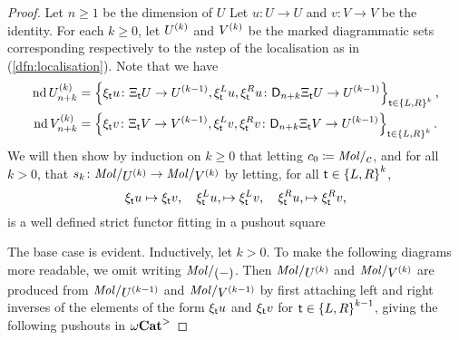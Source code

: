 \begin{proof}
    Let \( n \geq 1 \) be the dimension of \( U \)
    Let \( u \colon U \to U \) and \( v \colon V \to V \) be the identity.
    For each \( k \geq 0 \), let \( \order{k}{U} \) and \( \order{k}{V} \) be the marked diagrammatic sets corresponding respectively to the \( n \)\nbd step of the localisation as in (\ref{dfn:localisation}).
    Note that we have
    \begin{align*}
        \nd \gr{n + k}{\order{k}{U}} &= \set{\hinv{\s}u \colon \hcyl{\s} U \to \order{k - 1}{U}, \hinv{\s}^Lu, \hinv{\s}^Ru \colon \dual{n + k}{\hcyl{\s} U} \to \order{k - 1}{U}}_{\s \in \set{L, R}^k},\\
        \nd \gr{n + k}{\order{k}{V}} &= \set{\hinv{\s}v \colon \hcyl{\s} V \to \order{k - 1}{V}, \hinv{\s}^Lv, \hinv{\s}^Rv \colon \dual{n + k}{\hcyl{\s} V} \to \order{k - 1}{U}}_{\s \in \set{L, R}^k}.
    \end{align*}
    We will then show by induction on \( k \geq 0 \) that letting \( c_0 \eqdef \molecin{c} \), and for all \( k > 0 \), that \( s_k \colon \molecin{\order{k}{U}} \to \molecin{\order{k}{V}} \) by letting, for all \( \s \in \set{L, R}^k \),
    \begin{equation*}
        \hinv{\s}u \mapsto \hinv{\s}v,\quad \hinv{\s}^Lu, \mapsto \hinv{\s}^Lv,\quad \hinv{\s}^Ru, \mapsto \hinv{\s}^Rv,
    \end{equation*}
    is a well defined strict functor fitting in a pushout square
    \begin{center} \label{tik:inductive_square_subdivision_localisation}
    \end{center}
    The base case is evident.
    Inductively, let \( k > 0 \).
    To make the following diagrams more readable, we omit writing \( \molecin{(-)} \). 
    Then \( {\molecin{\order k U}} \) and \( {\molecin{\order k V}} \) are produced from \( {\molecin{\order {k - 1} U}} \) and \( {\molecin{\order {k - 1} V}} \) by first attaching left and right inverses of the elements of the form \( \hinv{\s}u \) and \( \hinv{\s}v \) for \( \s \in \set{L, R}^{k - 1} \), giving the following pushouts in \( \somegaCat \)

\end{proof}
